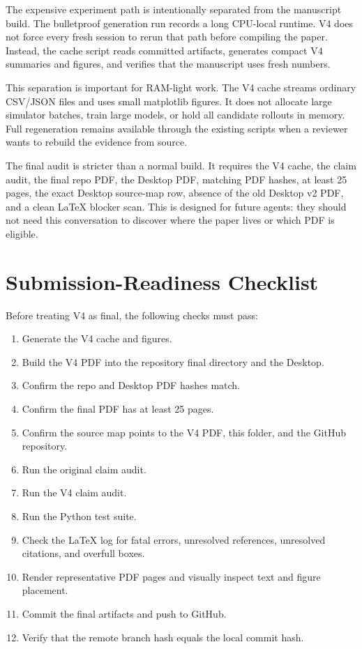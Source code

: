 \documentclass{article}
\begin{document}
The expensive experiment path is intentionally separated from the manuscript
build.  The bulletproof generation run records a long CPU-local runtime.  V4
does not force every fresh session to rerun that path before compiling the
paper.  Instead, the cache script reads committed artifacts, generates compact
V4 summaries and figures, and verifies that the manuscript uses fresh numbers.

This separation is important for RAM-light work.  The V4 cache streams ordinary
CSV/JSON files and uses small matplotlib figures.  It does not allocate large
simulator batches, train large models, or hold all candidate rollouts in memory.
Full regeneration remains available through the existing scripts when a reviewer
wants to rebuild the evidence from source.

The final audit is stricter than a normal build.  It requires the V4 cache, the
claim audit, the final repo PDF, the Desktop PDF, matching PDF hashes, at least
25 pages, the exact Desktop source-map row, absence of the old Desktop v2 PDF,
and a clean LaTeX blocker scan.  This is designed for future agents: they should
not need this conversation to discover where the paper lives or which PDF is
eligible.

\section{Submission-Readiness Checklist}

Before treating V4 as final, the following checks must pass:
\begin{enumerate}
\item Generate the V4 cache and figures.
\item Build the V4 PDF into the repository final directory and the Desktop.
\item Confirm the repo and Desktop PDF hashes match.
\item Confirm the final PDF has at least 25 pages.
\item Confirm the source map points to the V4 PDF, this folder, and the GitHub
repository.
\item Run the original claim audit.
\item Run the V4 claim audit.
\item Run the Python test suite.
\item Check the LaTeX log for fatal errors, unresolved references, unresolved
citations, and overfull boxes.
\item Render representative PDF pages and visually inspect text and figure
placement.
\item Commit the final artifacts and push to GitHub.
\item Verify that the remote branch hash equals the local commit hash.
\end{enumerate}
\end{document}
